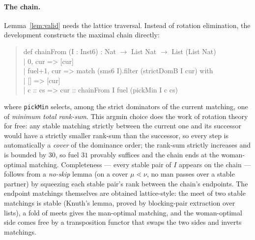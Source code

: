 \documentclass[11pt]{article}
\begin{document}
\paragraph{The chain.} Lemma~\ref{lem:valid} needs the lattice traversal. Instead
of rotation elimination, the development constructs the maximal chain directly:
\begin{quote}\small\ttfamily
def chainFrom (I : Inst6) : Nat $\to$ List Nat $\to$ List (List Nat)\\
\phantom{xx}| 0, cur => [cur]\\
\phantom{xx}| fuel+1, cur => match (sms6 I).filter (strictDomB I cur) with\\
\phantom{xxxx}| [] => [cur]\\
\phantom{xxxx}| c :: cs => cur :: chainFrom I fuel (pickMin I c cs)
\end{quote}
where \texttt{pickMin} selects, among the strict dominators of the current
matching, one of \emph{minimum total rank-sum}. This argmin choice does the work of
rotation theory for free: any stable matching strictly between the current one and
its successor would have a strictly smaller rank-sum than the successor, so every
step is automatically a \emph{cover} of the dominance order; the rank-sum strictly
increases and is bounded by $30$, so fuel $31$ provably suffices and the chain ends
at the woman-optimal matching. Completeness --- every stable pair of $I$ appears on
the chain --- follows from a \emph{no-skip} lemma (on a cover $\mu\lessdot\nu$, no
man passes over a stable partner) by squeezing each stable pair's rank between the
chain's endpoints. The endpoint matchings themselves are obtained lattice-style:
the meet of two stable matchings is stable (Knuth's lemma, proved by blocking-pair
extraction over lists), a fold of meets gives the man-optimal matching, and the
woman-optimal side comes free by a transposition functor that swaps the two sides
and inverts matchings.
\end{document}
